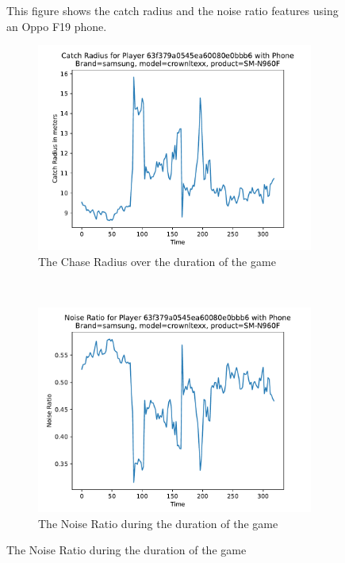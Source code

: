 \documentclass{l4proj}
\begin{document}
\begin{appendices}
\begin{figure}
    \caption{This figure shows the catch radius and the noise ratio features using an Oppo F19 phone.
    }
    \label{fig:opponoiseandcatch}
\end{figure}
\begin{figure}
    
    \centering
    \begin{subfigure}[b]{0.48\textwidth}
        \includegraphics[width=\textwidth]{images/samsung-crownltexx-radius.pdf}
        \caption{The Chase Radius over the duration of the game}
        \label{fig:note9catchradius}
    \end{subfigure}
    ~ %
    \begin{subfigure}[b]{0.48\textwidth}
        \includegraphics[width=\textwidth]{images/samsung-crownltexx-noiseRatio.pdf}
        \caption{The Noise Ratio during the duration of the game}
        \label{fig:note9noiseratio}
    \end{subfigure}
    

\end{figure}
\end{appendices}
\end{document}

